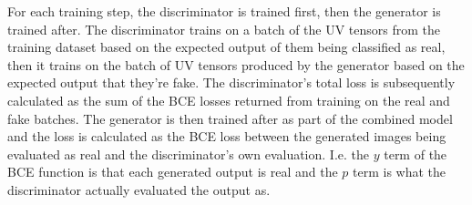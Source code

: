 \documentclass{l4proj}
\begin{document}
For each training step, the discriminator is trained first, then the generator is trained after. The discriminator trains on a batch of the UV tensors from the training dataset based on the expected output of them being classified as real, then it trains on the batch of UV tensors produced by the generator based on the expected output that they're fake. The discriminator's total loss is subsequently calculated as the sum of the BCE losses returned from training on the real and fake batches. The generator is then trained after as part of the combined model and the loss is calculated as the BCE loss between the generated images being evaluated as real and the discriminator's own evaluation. I.e. the $y$ term of the BCE function is that each generated output is real and the $p$ term is what the discriminator actually evaluated the output as.
\end{document}
